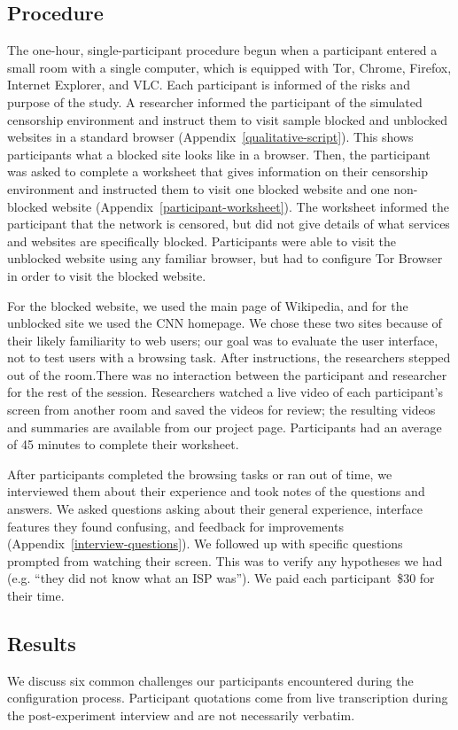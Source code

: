 \documentclass[USenglish,oneside,twocolumn]{article}
\begin{document}
{\subsection{Procedure}
The one-hour, single-participant procedure begun when a participant entered a small 
room with a single computer, which is equipped with Tor, Chrome, Firefox, Internet Explorer, and VLC.
Each participant is informed of the risks and purpose of the study.
A researcher informed the participant of the simulated censorship environment and
instruct them to visit sample blocked and unblocked websites
in a standard browser (Appendix~\ref{qualitative-script}). 
This shows participants what a blocked site looks like in a browser. 
Then, the participant was asked to complete a worksheet that gives information
on their censorship environment and instructed them
to visit one blocked website and one non-blocked website (Appendix~\ref{participant-worksheet}).
The worksheet informed the participant that the network is censored,
but did not give details of what services and websites are specifically blocked.
Participants were able to visit the unblocked website using any familiar browser,
but had to configure Tor Browser in order to visit the blocked website.
 
For the blocked website, we used the main page of Wikipedia,
and for the unblocked site we used the CNN homepage.
We chose these two sites because of their likely familiarity to web users;
our goal was to evaluate the user interface, not to test users with a browsing task.
After instructions, the researchers stepped out of the room.There was no interaction
between the participant and researcher for the rest of the session.
Researchers watched a live video of each participant's screen from another room
and saved the videos for review; the resulting videos and summaries
are available from our project page.
Participants had an average of 45 minutes to complete their worksheet. 

After participants completed the browsing tasks or ran out of time,
we interviewed them about their experience and
took notes of the questions and answers.
We asked questions asking about their general experience, 
interface features they found confusing, and feedback for improvements (Appendix~\ref{interview-questions}). 
We followed up with specific questions prompted from watching their screen. 
This was to verify any hypotheses we had (e.g. ``they did not know what an ISP was'').
We paid each participant~\$30 for their time. 

\subsection{Results} 
We discuss six common challenges our participants encountered during the configuration process.
Participant quotations come from live transcription during the post-experiment interview
and are not necessarily verbatim.\\

}
\end{document}
